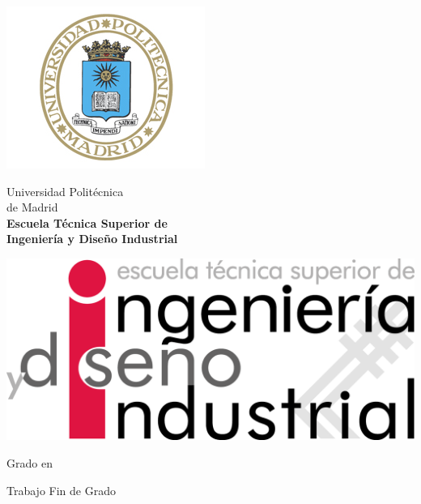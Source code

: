 \begin{titlepage}

  \begin{minipage}{0.1\linewidth}
    \hspace*{-1.5cm}
    \includegraphics[scale=0.4]{./include/EscUpm.png} \qquad\qquad
  \end{minipage}
  \begin{minipage}{0.6\linewidth}
    \begin{center}
      \huge{ Universidad Politécnica\\de Madrid }\\
      \vspace*{0.5cm}
      \Large{\textbf{Escuela Técnica Superior de \\Ingeniería y Diseño Industrial}}
    \end{center}
  \end{minipage}
  \begin{minipage}{0.1\linewidth}
    \includegraphics[scale=0.4]{./include/ETSIDI_Logo_color.png}
  \end{minipage}

  \vspace*{1cm}
  \begin{center}
    \Large{Grado en  \Grado{} }
  \end{center}

  \vspace*{1cm}
  \begin{center}
    \huge{Trabajo Fin de Grado}
  \end{center}


\end{titlepage}
